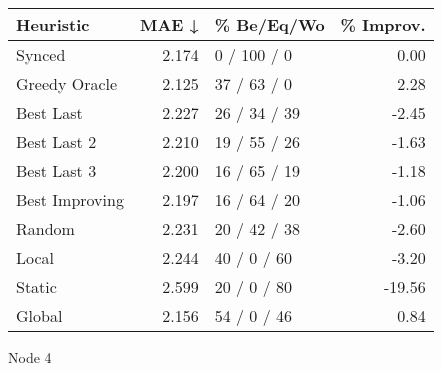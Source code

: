 \begin{tabular}{lrlr}
\toprule
\textbf{Heuristic} & \textbf{MAE ↓} & \textbf{\% Be/Eq/Wo} & \textbf{\% Improv.} \\
\midrule
            Synced &          2.174 &          0 / 100 / 0 &                0.00 \\
     Greedy Oracle &          2.125 &          37 / 63 / 0 &                2.28 \\
         Best Last &          2.227 &         26 / 34 / 39 &               -2.45 \\
       Best Last 2 &          2.210 &         19 / 55 / 26 &               -1.63 \\
       Best Last 3 &          2.200 &         16 / 65 / 19 &               -1.18 \\
    Best Improving &          2.197 &         16 / 64 / 20 &               -1.06 \\
            Random &          2.231 &         20 / 42 / 38 &               -2.60 \\
             Local &          2.244 &          40 / 0 / 60 &               -3.20 \\
            Static &          2.599 &          20 / 0 / 80 &              -19.56 \\
            Global &          2.156 &          54 / 0 / 46 &                0.84 \\
\bottomrule
\end{tabular}
\caption{Node 4}
\label{tab:hr_iid_lr05_le1_bs4_4}
